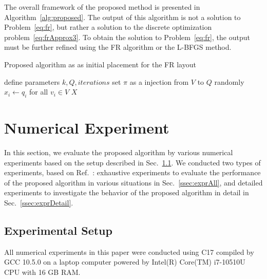 \documentclass[dvipdfmx,lettersize,journal]{IEEEtran}
\newcommand{\Cpp}{C\nolinebreak[4]\hspace{-.05em}\raisebox{.4ex}{\relsize{-3}{\textbf{++}}}}
\begin{document}
The overall framework of the proposed method is presented in Algorithm~\ref{alg:proposed}.
The output of this algorithm is not a solution to Problem~\eqref{eq:fr}, but rather a solution to the discrete optimization problem~\eqref{eq:frApprox3}.
To obtain the solution to Problem~\eqref{eq:fr}, the output must be further refined using the FR algorithm or the L-BFGS method.

\begin{algorithm}[ht]
  \caption{Proposed algorithm as as initial placement for the FR layout}
  \label{alg:proposed}

  define parameters $k, Q, \textit{iterations}$\;
  set $\pi$ as a injection from $V$ to $Q$ randomly\;
  $x_i \gets q_i$ for all $v_i \in V$\;
  \Return $X$
\end{algorithm}

\section{Numerical Experiment} \label{sec:experiment}

In this section, we evaluate the proposed algorithm by various numerical experiments based on the setup described in Sec.~\ref{ssec:setup}.
We conducted two types of experiments, based on Ref.~\cite{8419285}: exhaustive experiments to evaluate the performance of the proposed algorithm in various situations in Sec.~\ref{ssec:exprAll}, and detailed experiments to investigate the behavior of the proposed algorithm in detail in Sec.~\ref{ssec:exprDetail}.

\subsection{Experimental Setup}\label{ssec:setup}

All numerical experiments in this paper were conducted using \Cpp17 compiled by GCC 10.5.0 on a laptop computer powered by Intel(R) Core(TM) i7-10510U CPU with 16 GB RAM.
\end{document}
